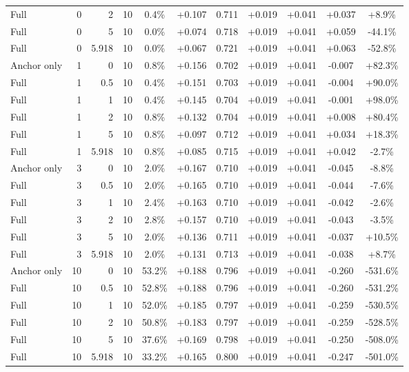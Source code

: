 \begin{table}[htbp]
\begin{tabular}{lrrrccccccc}
Full & 0 & 2 & 10 & 0.4\% & +0.107 & 0.711 & +0.019 & +0.041 & +0.037 & +8.9\% \\
Full & 0 & 5 & 10 & 0.0\% & +0.074 & 0.718 & +0.019 & +0.041 & +0.059 & -44.1\% \\
Full & 0 & 5.918 & 10 & 0.0\% & +0.067 & 0.721 & +0.019 & +0.041 & +0.063 & -52.8\% \\
Anchor only & 1 & 0 & 10 & 0.8\% & +0.156 & 0.702 & +0.019 & +0.041 & -0.007 & +82.3\% \\
Full & 1 & 0.5 & 10 & 0.4\% & +0.151 & 0.703 & +0.019 & +0.041 & -0.004 & +90.0\% \\
Full & 1 & 1 & 10 & 0.4\% & +0.145 & 0.704 & +0.019 & +0.041 & -0.001 & +98.0\% \\
Full & 1 & 2 & 10 & 0.8\% & +0.132 & 0.704 & +0.019 & +0.041 & +0.008 & +80.4\% \\
Full & 1 & 5 & 10 & 0.8\% & +0.097 & 0.712 & +0.019 & +0.041 & +0.034 & +18.3\% \\
Full & 1 & 5.918 & 10 & 0.8\% & +0.085 & 0.715 & +0.019 & +0.041 & +0.042 & -2.7\% \\
Anchor only & 3 & 0 & 10 & 2.0\% & +0.167 & 0.710 & +0.019 & +0.041 & -0.045 & -8.8\% \\
Full & 3 & 0.5 & 10 & 2.0\% & +0.165 & 0.710 & +0.019 & +0.041 & -0.044 & -7.6\% \\
Full & 3 & 1 & 10 & 2.4\% & +0.163 & 0.710 & +0.019 & +0.041 & -0.042 & -2.6\% \\
Full & 3 & 2 & 10 & 2.8\% & +0.157 & 0.710 & +0.019 & +0.041 & -0.043 & -3.5\% \\
Full & 3 & 5 & 10 & 2.0\% & +0.136 & 0.711 & +0.019 & +0.041 & -0.037 & +10.5\% \\
Full & 3 & 5.918 & 10 & 2.0\% & +0.131 & 0.713 & +0.019 & +0.041 & -0.038 & +8.7\% \\
Anchor only & 10 & 0 & 10 & 53.2\% & +0.188 & 0.796 & +0.019 & +0.041 & -0.260 & -531.6\% \\
Full & 10 & 0.5 & 10 & 52.8\% & +0.188 & 0.796 & +0.019 & +0.041 & -0.260 & -531.2\% \\
Full & 10 & 1 & 10 & 52.0\% & +0.185 & 0.797 & +0.019 & +0.041 & -0.259 & -530.5\% \\
Full & 10 & 2 & 10 & 50.8\% & +0.183 & 0.797 & +0.019 & +0.041 & -0.259 & -528.5\% \\
Full & 10 & 5 & 10 & 37.6\% & +0.169 & 0.798 & +0.019 & +0.041 & -0.250 & -508.0\% \\
Full & 10 & 5.918 & 10 & 33.2\% & +0.165 & 0.800 & +0.019 & +0.041 & -0.247 & -501.0\% \\

\end{tabular}
\end{table}
